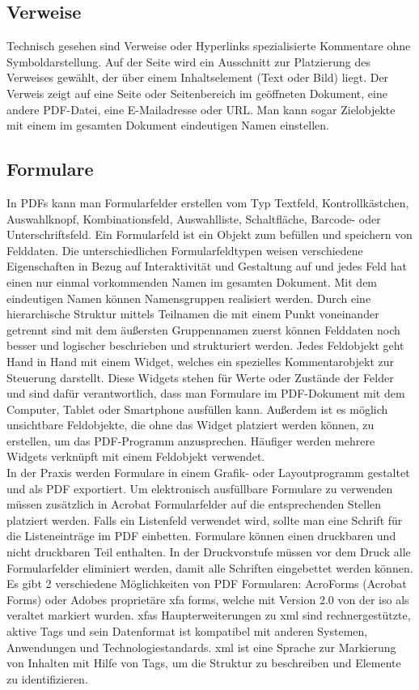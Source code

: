 \subsection{Verweise}
Technisch gesehen sind Verweise oder Hyperlinks spezialisierte Kommentare ohne Symboldarstellung. Auf der Seite wird ein Ausschnitt zur Platzierung des Verweises gewählt, der über einem Inhaltselement (Text oder Bild) liegt. Der Verweis zeigt auf eine Seite oder Seitenbereich im geöffneten Dokument, eine andere PDF-Datei, eine E-Mailadresse oder URL. Man kann sogar Zielobjekte mit einem im gesamten Dokument eindeutigen Namen einstellen. \cite{softx}

\subsection{Formulare}
In PDFs kann man Formularfelder erstellen vom Typ Textfeld, Kontrollkästchen, Auswahlknopf, Kombinationsfeld, Auswahlliste, Schaltfläche, Barcode- oder Unterschriftsfeld. Ein Formularfeld ist ein Objekt zum befüllen und speichern von Felddaten. Die unterschiedlichen Formularfeldtypen weisen verschiedene Eigenschaften in Bezug auf Interaktivität und Gestaltung auf und jedes Feld hat einen nur einmal vorkommenden Namen im gesamten Dokument. Mit dem eindeutigen Namen können Namensgruppen realisiert werden. Durch eine hierarchische Struktur mittels Teilnamen die mit einem Punkt voneinander getrennt sind mit dem äußersten Gruppennamen zuerst können Felddaten noch besser und logischer beschrieben und strukturiert werden. Jedes Feldobjekt geht Hand in Hand mit einem Widget, welches ein spezielles Kommentarobjekt zur Steuerung darstellt. Diese Widgets stehen für Werte oder Zustände der Felder und sind dafür verantwortlich, dass man Formulare im PDF-Dokument mit dem Computer, Tablet oder Smartphone ausfüllen kann. Außerdem ist es möglich unsichtbare Feldobjekte, die ohne das Widget platziert werden können, zu erstellen, um das PDF-Programm anzusprechen. Häufiger werden mehrere Widgets verknüpft mit einem Feldobjekt verwendet. \\ \cite{softx}
In der Praxis werden Formulare in einem Grafik- oder Layoutprogramm gestaltet und als PDF exportiert. Um elektronisch ausfüllbare Formulare zu verwenden müssen zusätzlich in Acrobat Formularfelder auf die entsprechenden Stellen platziert werden. Falls ein Listenfeld verwendet wird, sollte man eine Schrift für die Listeneinträge im PDF einbetten. Formulare können einen druckbaren und nicht druckbaren Teil enthalten. In der Druckvorstufe müssen vor dem Druck alle Formularfelder eliminiert werden, damit alle Schriften eingebettet werden können. \cite{schneeberger} Es gibt 2 verschiedene Möglichkeiten von PDF Formularen: AcroForms (Acrobat Forms) oder Adobes proprietäre \gls{xfa} forms, welche mit Version 2.0 von der \gls{iso} als veraltet markiert wurden. \gls{xfa}s Haupterweiterungen zu \gls{xml} sind rechnergestützte, aktive Tags und sein Datenformat ist kompatibel mit anderen Systemen, Anwendungen und Technologiestandards. \cite{wiki-xfa} \gls{xml} ist eine Sprache zur Markierung von Inhalten mit Hilfe von Tags, um die Struktur zu beschreiben und Elemente zu identifizieren.
